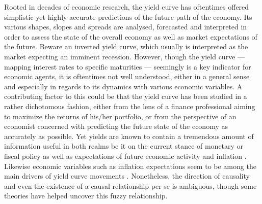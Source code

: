 Rooted in decades of economic research, the yield curve has oftentimes offered simplistic yet highly accurate predictions of the future path of the economy. 
Its various shapes, slopes and spreads are analysed, forecasted and interpreted in order to assess the state of the overall economy as well as market expectations of the future.
Beware an inverted yield curve, which usually is interpreted as the market expecting an imminent recession. 
However, though the yield curve --- mapping interest rates to specific maturities --- seemingly is a key indicator for economic agents, it is oftentimes not well understood, either in a general sense and especially in regards to its dynamics with various economic variables.
A contributing factor to this could be that the yield curve has been studied in a rather dichotomous fashion, either from the lens of a finance professional aiming to maximize the returns of his/her portfolio, or from the perspective of an economist concerned with predicting the future state of the economy as accurately as possible. 
Yet yields are known to contain a tremendous amount of information useful in both realms be it on the current stance of monetary or fiscal policy as well as expectations of future economic activity and inflation \citep{evans2007economic}.
Likewise economic variables such as inflation expectations seem to be among the main drivers of yield curve movements \citep{Gürkaynak_Wright_2012}. 
Nonetheless, the direction of causality and even the existence of a causal relationship per se is ambiguous, though some theories have helped uncover this fuzzy relationship. 

